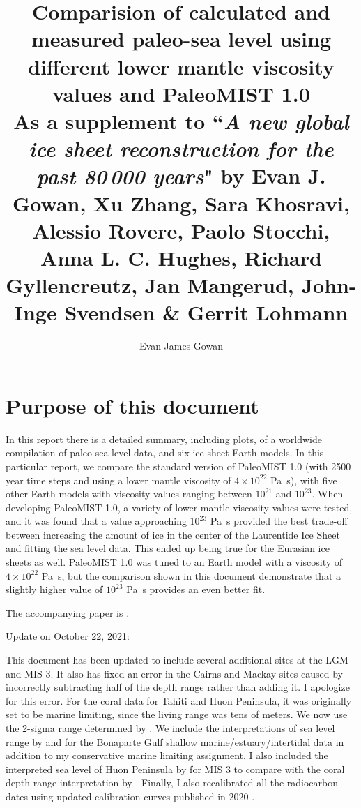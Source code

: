 \documentclass[a4paper,12pt]{article}
\begin{document}
\title{Comparision of calculated and measured paleo-sea level using different lower mantle viscosity values and PaleoMIST 1.0 \\
\normalsize As a supplement to ``\emph{A new global ice sheet reconstruction for the past 80\,000 years}" by Evan J. Gowan, Xu Zhang, Sara Khosravi, Alessio Rovere, Paolo Stocchi, Anna L. C. Hughes, Richard Gyllencreutz, Jan Mangerud, John-Inge Svendsen \& Gerrit Lohmann}

\author{Evan James Gowan}
    
\date{}

\maketitle

\tableofcontents

\newpage

\section{Purpose of this document}

In this report there is a detailed summary, including plots, of a worldwide compilation of paleo-sea level data, and six ice sheet-Earth models. In this particular report, we compare the standard version of PaleoMIST 1.0 (with 2500 year time steps and using a lower mantle viscosity of $4\times10^{22}$ Pa~s), with five other Earth models with viscosity values ranging between $10^{21}$ and $10^{23}$. When developing PaleoMIST 1.0, a variety of lower mantle viscosity values were tested, and it was found that a value approaching $10^{23}$ Pa~s provided the best trade-off between increasing the amount of ice in the center of the Laurentide Ice Sheet and fitting the sea level data. This ended up being true for the Eurasian ice sheets as well. PaleoMIST 1.0 was tuned to an Earth model with a viscosity of $4\times10^{22}$ Pa~s, but the comparison shown in this document demonstrate that a slightly higher value of $10^{23}$ Pa~s provides an even better fit.

The accompanying paper is \citep{GowanEtal2021b}.

Update on October 22, 2021:

This document has been updated to include several additional sites at the LGM and MIS 3. It also has fixed an error in the Cairns and Mackay sites caused by incorrectly subtracting half of the depth range rather than adding it. I apologize for this error. For the coral data for Tahiti and Huon Peninsula, it was originally set to be marine limiting, since the living range was tens of meters. We now use the 2-sigma range determined by \citet{HibbertEtal2016}. We include the interpretations of sea level range by \citet{IshiwaEtal2019} and \citet{YokoyamaEtal2000} for the Bonaparte Gulf shallow marine/estuary/intertidal data in addition to my conservative marine limiting assignment. I also included the interpreted sea level of Huon Peninsula by \citet{deGelderEtal2021} for MIS 3 to compare with the coral depth range interpretation by \citet{HibbertEtal2016}. Finally, I also recalibrated all the radiocarbon dates using updated calibration curves published in 2020 \citep{HeatonEtal2020,HoggEtal2020,ReimerEtal2020}.
\end{document}

